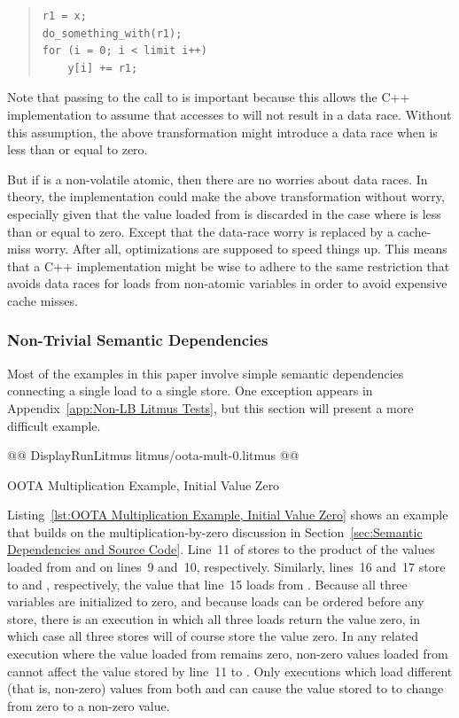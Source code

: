 \documentclass[10]{article}
\begin{document}
\begin{quote}
\begin{verbatim}
r1 = x;
do_something_with(r1);
for (i = 0; i < limit i++)
	y[i] += r1;
\end{verbatim}
\end{quote}

Note that passing  to the call to  is important
because this allows the C++ implementation to assume that accesses to 
will not result in a data race.
Without this assumption, the above transformation might introduce a data
race when  is less than or equal to zero.

But if  is a non-volatile atomic, then there are no worries about
data races.
In theory, the implementation could make the above transformation without
worry, especially given that the value loaded from  is discarded in
the case where  is less than or equal to zero.
Except that the data-race worry is replaced by a cache-miss worry.
After all, optimizations are supposed to speed things up.
This means that a C++ implementation might be wise to adhere to the
same restriction that avoids data races for loads from non-atomic
variables in order to avoid expensive cache misses.

\subsubsection{Non-Trivial Semantic Dependencies}
\label{app:Non-Trivial Semantic Dependencies}

Most of the examples in this paper involve simple semantic dependencies
connecting a single load to a single store.
One exception appears in
Appendix~\ref{app:Non-LB Litmus Tests},
but this section will present a more difficult example.

\begin{listing}[tbp]
@@ DisplayRunLitmus litmus/oota-mult-0.litmus @@
\caption{OOTA Multiplication Example, Initial Value Zero}
\label{lst:OOTA Multiplication Example, Initial Value Zero}
\end{listing}

Listing~\ref{lst:OOTA Multiplication Example, Initial Value Zero}
shows an example that builds on the multiplication-by-zero
discussion in
Section~\ref{sec:Semantic Dependencies and Source Code}.
Line~11 of  stores to  the product of the values loaded from
 and  on lines~9 and~10, respectively.
Similarly, lines~16 and~17 store to  and , respectively,
the value that line~15 loads from .
Because all three variables are initialized to zero, and because loads
can be ordered before any store, there is an execution in which all
three loads return the value zero, in which case all three stores will
of course store the value zero.
In any related execution where the value loaded from  remains zero,
non-zero values loaded from  cannot affect the value stored by
line~11 to .
Only executions which load different (that is, non-zero) values from
both  and  can cause the value stored to  to change
from zero to a non-zero value.
\end{document}
